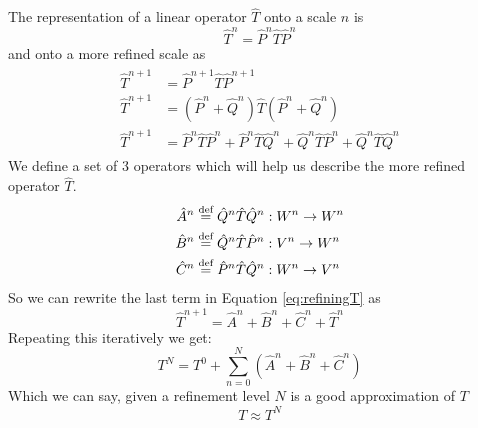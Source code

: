 \documentclass[../master_thesis.tex]{subfiles}
\begin{document}
The representation of a linear operator $\hat{T}$ onto a scale $n$ is
\begin{equation}\label{eq:PTP}
  \hat{T}^n = \hat{P}^n\hat{T}\hat{P}^n
\end{equation}
and onto a more refined scale as
\begin{align}\label{eq:refiningT}
  \begin{split}
    \hat{T}^{n+1} &= \hat{P}^{n+1}\hat{T}\hat{P}^{n+1}\\
    \hat{T}^{n+1} &= (\hat{P}^n + \hat{Q}^n)\hat{T}(\hat{P}^n + \hat{Q}^n)\\
    \hat{T}^{n+1} &= \hat{P}^n\hat{T}\hat{P}^n + \hat{P}^n\hat{T}\hat{Q}^n + \hat{Q}^n\hat{T}\hat{P}^n + \hat{Q}^n\hat{T}\hat{Q}^n
  \end{split}
\end{align}
We define a set of 3 operators which will help us describe the more refined operator
$\hat{T}$.
\begin{align}
  \hat{A}^n & \stackrel{\text{def}}{=}\hat{Q}^n\hat{T}\hat{Q}^n: W^n \to W^n\\
  \hat{B}^n & \stackrel{\text{def}}{=}\hat{Q}^n\hat{T}\hat{P}^n: V^n \to W^n\\
  \hat{C}^n & \stackrel{\text{def}}{=}\hat{P}^n\hat{T}\hat{Q}^n: W^n \to V^n
\end{align}
So we can rewrite the last term in Equation \ref{eq:refiningT} as
\begin{equation}\label{eq:refineT}
  \hat{T}^{n+1} =\hat{A}^n + \hat{B}^n + \hat{C}^n + \hat{T}^n
\end{equation}
Repeating this iteratively we get:
\begin{equation}\label{eq:}
  T^N = T^0 + \sum^N_{n=0}\left( \hat{A}^n + \hat{B}^n + \hat{C}^n\right)
\end{equation}
Which we can say, given a refinement level $N$ is a good approximation of $T$
\begin{equation}
  T \approx T^N
\end{equation}
\end{document}

